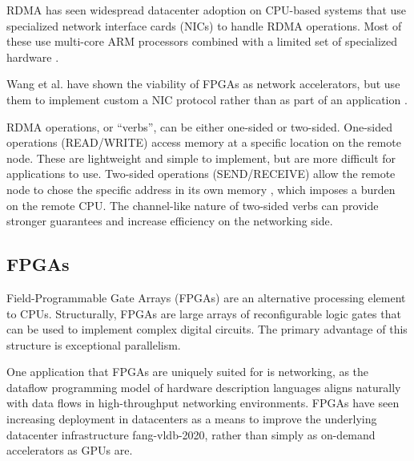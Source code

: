 RDMA has seen widespread datacenter adoption \cite{strom} on CPU-based systems that use specialized network interface cards (NICs) to handle RDMA operations. Most of these use multi-core ARM processors combined with a limited set of specialized hardware \cite{strom}.

Wang et al. have shown the viability of FPGAs as network accelerators, but use them to implement custom a NIC protocol rather than as part of an application \cite{star}.

RDMA operations, or ``verbs'', can be either one-sided or two-sided. One-sided operations (READ/WRITE) access memory at a specific location on the remote node. These are lightweight and simple to implement, but are more difficult for applications to use. Two-sided operations (SEND/RECEIVE) allow the remote node to chose the specific address in its own memory \cite{base}, which imposes a burden on the remote CPU. The channel-like nature of two-sided verbs can provide stronger guarantees and increase efficiency on the networking side.


\subsection{FPGAs}

Field-Programmable Gate Arrays (FPGAs) are an alternative processing element to CPUs. Structurally, FPGAs are large arrays of reconfigurable logic gates that can be used to implement complex digital circuits. The primary advantage of this structure is exceptional parallelism.

One application that FPGAs are uniquely suited for is networking, as the dataflow programming model of hardware description languages aligns naturally with data flows in high-throughput networking environments.
FPGAs have seen increasing deployment in datacenters as a means to improve the underlying datacenter infrastructure \cite{bobda-trets-2022}{fang-vldb-2020}, rather than simply as on-demand accelerators as GPUs are.


